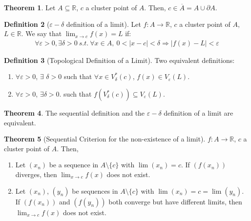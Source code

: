 \documentclass[reqno,11pt]{amsart}
\theoremstyle{definition}
\newtheorem{theorem}{Theorem}
\theoremstyle{definition}
\newtheorem{definition}[theorem]{Definition}
\theoremstyle{remark}
\newcommand{\R}{\mathbb{R}}
\newcommand{\eps}{\varepsilon}
\begin{document}
\begin{theorem}
	Let $A \subseteq \R$, $c$ a cluster point of $A$. Then, $c \in \overline{A} = A \cup \partial A$.	
\end{theorem}

\begin{definition}[$\eps- \delta$ definition of a limit]
	Let $f: A \rightarrow \R$, $c$ a cluster point of $A$, $L \in \R$. We say that $\lim_{x \rightarrow c} f(x) = L$ if: 
	\begin{align}
		\forall \eps > 0, \exists \delta > 0\ s.t.\ \forall x \in A,\ 0 < |x-c| < \delta \Rightarrow |f(x) - L| < \eps 	
	\end{align}
\end{definition}

\begin{definition}[Topological Definition of a Limit] 
Two equivalent definitions:
\begin{enumerate}[noitemsep]
	\item 	$\forall \eps > 0$, $\exists$ $\delta > 0$ such that $\forall x \in V_\delta^*(c)$, $f(x) \in V_\eps (L)$. 
	\item $\forall \eps > 0$, $\exists \delta > 0$. such that $f(V_\delta^*(c)) \subseteq V_\eps (L)$.
\end{enumerate}
\end{definition}


\begin{theorem}
	The sequential definition and the $\eps-\delta$ definition of a limit are equivalent. 
\end{theorem}

\begin{theorem}[Sequential Criterion for the non-existence of a limit]
	$f: A \rightarrow \R$, $c$ a cluster point of $A$. Then, 
	\begin{enumerate}[noitemsep]
		\item Let $(x_n)$ be a sequence in $A \setminus \{ c \}$ with $\lim (x_n) = c$. If $(f(x_n))$ diverges, then $\lim_{x \rightarrow c} f(x)$ does not exist.
		\item Let $(x_n)$, $(y_n)$ be sequences in $A \setminus \{ c \}$ with $\lim (x_n) = c = \lim (y_n)$. If $(f(x_n))$ and $(f(y_n))$ both converge but have different limits, then $\lim_{x \rightarrow c}f(x) $ does not exist.
	\end{enumerate}
\end{theorem}
\end{document}
